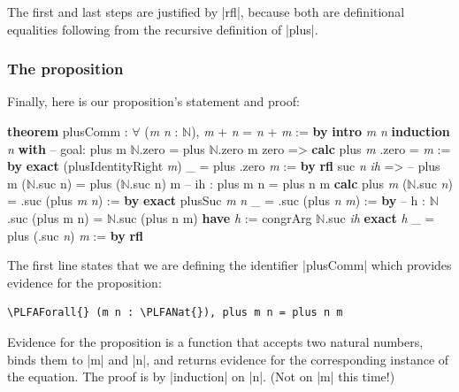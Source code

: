 \documentclass{memoir}
\newcommand{\PLFANat}{\ensuremath{\mathbb{N}}}
\newcommand{\PLFAForall}{\ensuremath{\forall}}
\newcommand{\PLFAComment}[1]{\textcolor{codecomment}{#1}}
\begin{document}
\par
The first and last steps are justified by \LeanVerb|rfl|, because both are definitional
equalities following from the recursive definition of \LeanVerb|plus|.

\par

\subsubsection{The proposition}\label{PLFA--in--Lean----Part--1----Induction-005F-005F-005F--Proof--by--Induction----Second--proof-005F-005F-005F--commutativity----The--proposition}

\par
\par\noindent Finally, here is our proposition's statement and proof:\begin{LeanVerbatim}
\textbf{theorem} plusComm : \PLFAForall{} (\textit{m} \textit{n} : \PLFANat{}), \textit{m} + \textit{n} = \textit{n} + \textit{m} := \textbf{by}
    \textbf{intro} \textit{m} \textit{n}
    \textbf{induction} \textit{n} \textbf{with}
    \PLFAComment{-- goal: plus m \PLFANat{}.zero = plus \PLFANat{}.zero m}
     zero =>
        \textbf{calc}
            plus \textit{m} .zero
          = \textit{m}            := \textbf{by} \textbf{exact} (plusIdentityRight \textit{m})
        _ = plus .zero \textit{m} := \textbf{by} \textbf{rfl}
     suc \textit{n} \textit{ih} =>
        \PLFAComment{-- plus m (\PLFANat{}.suc n) = plus (\PLFANat{}.suc n) m}
        \PLFAComment{-- ih : plus m n = plus n m}
        \textbf{calc}
            plus \textit{m} (\PLFANat{}.suc \textit{n})
          = .suc (plus \textit{m} \textit{n}) := \textbf{by} \textbf{exact} plusSuc \textit{m} \textit{n}
        _ = .suc (plus \textit{n} \textit{m}) := \textbf{by}
            \PLFAComment{-- h : \PLFANat{}.suc (plus m n) = \PLFANat{}.suc (plus n m)}
            \textbf{have} \textit{h} := congrArg \PLFANat{}.suc \textit{ih}
            \textbf{exact} \textit{h}
        _ = plus (.suc \textit{n}) \textit{m} := \textbf{by} \textbf{rfl}
\end{LeanVerbatim}
The first line states that we are defining the identifier \LeanVerb|plusComm| which
provides evidence for the proposition:\begin{verbatim}
\PLFAForall{} (m n : \PLFANat{}), plus m n = plus n m
\end{verbatim}
Evidence for the proposition is a function that accepts two natural numbers,
binds them to \LeanVerb|m| and \LeanVerb|n|, and returns evidence for the corresponding instance
of the equation. The proof is by \LeanVerb|induction| on \LeanVerb|n|. (Not on \LeanVerb|m| this time!)
\end{document}
